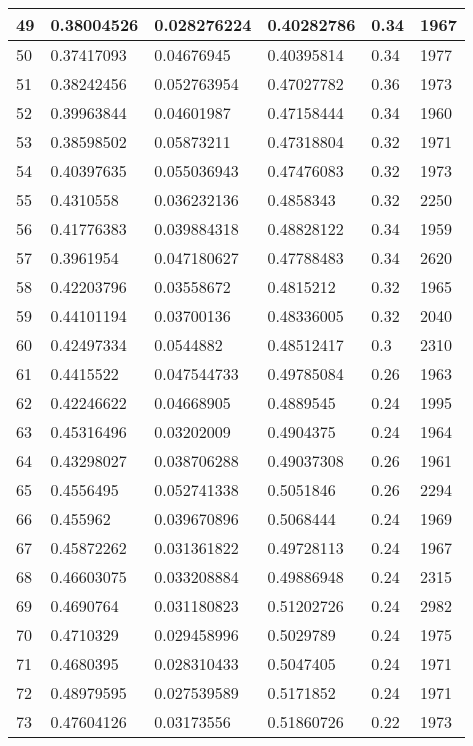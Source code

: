 \begin{longtable}{|l|l|l|l|l|l|}
49 & 0.38004526 & 0.028276224 & 0.40282786 & 0.34 & 1967 \\ \hline 
50 & 0.37417093 & 0.04676945 & 0.40395814 & 0.34 & 1977 \\ \hline 
51 & 0.38242456 & 0.052763954 & 0.47027782 & 0.36 & 1973 \\ \hline 
52 & 0.39963844 & 0.04601987 & 0.47158444 & 0.34 & 1960 \\ \hline 
53 & 0.38598502 & 0.05873211 & 0.47318804 & 0.32 & 1971 \\ \hline 
54 & 0.40397635 & 0.055036943 & 0.47476083 & 0.32 & 1973 \\ \hline 
55 & 0.4310558 & 0.036232136 & 0.4858343 & 0.32 & 2250 \\ \hline 
56 & 0.41776383 & 0.039884318 & 0.48828122 & 0.34 & 1959 \\ \hline 
57 & 0.3961954 & 0.047180627 & 0.47788483 & 0.34 & 2620 \\ \hline 
58 & 0.42203796 & 0.03558672 & 0.4815212 & 0.32 & 1965 \\ \hline 
59 & 0.44101194 & 0.03700136 & 0.48336005 & 0.32 & 2040 \\ \hline 
60 & 0.42497334 & 0.0544882 & 0.48512417 & 0.3 & 2310 \\ \hline 
61 & 0.4415522 & 0.047544733 & 0.49785084 & 0.26 & 1963 \\ \hline 
62 & 0.42246622 & 0.04668905 & 0.4889545 & 0.24 & 1995 \\ \hline 
63 & 0.45316496 & 0.03202009 & 0.4904375 & 0.24 & 1964 \\ \hline 
64 & 0.43298027 & 0.038706288 & 0.49037308 & 0.26 & 1961 \\ \hline 
65 & 0.4556495 & 0.052741338 & 0.5051846 & 0.26 & 2294 \\ \hline 
66 & 0.455962 & 0.039670896 & 0.5068444 & 0.24 & 1969 \\ \hline 
67 & 0.45872262 & 0.031361822 & 0.49728113 & 0.24 & 1967 \\ \hline 
68 & 0.46603075 & 0.033208884 & 0.49886948 & 0.24 & 2315 \\ \hline 
69 & 0.4690764 & 0.031180823 & 0.51202726 & 0.24 & 2982 \\ \hline 
70 & 0.4710329 & 0.029458996 & 0.5029789 & 0.24 & 1975 \\ \hline 
71 & 0.4680395 & 0.028310433 & 0.5047405 & 0.24 & 1971 \\ \hline 
72 & 0.48979595 & 0.027539589 & 0.5171852 & 0.24 & 1971 \\ \hline 
73 & 0.47604126 & 0.03173556 & 0.51860726 & 0.22 & 1973 \\ \hline 

\end{longtable}
